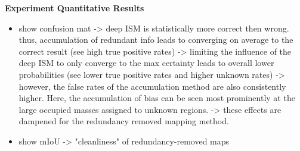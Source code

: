 \textbf{Experiment Quantitative Results}
\begin{itemize}
	\item show confusion mat
		-> deep ISM is statistically more correct then wrong. thus, accumulation of redundant info leads to converging on average to the correct result (see high true positive rates)
		-> limiting the influence of the deep ISM to only converge to the max certainty leads to overall lower probabilities (see lower true positive rates and higher unknown rates)
		-> however, the false rates of the accumulation method are also consistently higher. Here, the accumulation of bias can be seen most prominently at the large occupied masses assigned to unknown regions.
		-> these effects are dampened for the redundancy removed mapping method.
	\item show mIoU 
		-> "cleanliness" of redundancy-removed maps
\end{itemize}
